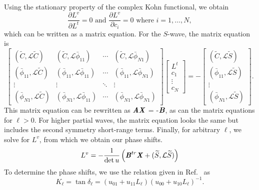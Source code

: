 \documentclass[preprint,showpacs,showkeys,preprintnumbers,amsmath,amssymb,longbibliography,pra,aps]{revtex4-1}
\begin{document}
Using the stationary property of the complex Kohn functional, we obtain
\begin{equation}
\frac{\partial L^v}{\partial L^t} = 0  \text{ and }
  \frac{\partial L^v}{\partial c_i} = 0 \text{ where $i = 1,\ldots,N$},
\label{eq:ComplexKohnStationary}
\end{equation}
which can be written as a matrix equation. For the $S$-wave, the matrix
equation is
\begin{equation}
\label{eq:ComplexKohnMatrix}
\begin{bmatrix} 
 (\widetilde{C},\mathcal{L}\widetilde{C}) & (\widetilde{C},\mathcal{L}\bar{\phi}_{11}) & \cdots & (\widetilde{C},\mathcal{L}\bar{\phi}_{N1})\\
 (\bar{\phi}_{11},\mathcal{L}\widetilde{C}) & (\bar{\phi}_{11},\mathcal{L}\bar{\phi}_{11}) & \cdots & (\bar{\phi}_{11},\mathcal{L}\bar{\phi}_{N1})\\
 \vdots & \vdots & \ddots & \vdots \\
 (\bar{\phi}_{N1},\mathcal{L}\widetilde{C}) & (\bar{\phi}_{N1},\mathcal{L}\bar{\phi}_{11}) & \cdots & (\bar{\phi}_{N1},\mathcal{L}\bar{\phi}_{N1})
\end{bmatrix}
\begin{bmatrix}
L^t\\
c_1\\
\vdots\\
c_N
\end{bmatrix}
= -
\begin{bmatrix}
(\widetilde{C},\mathcal{L}\widetilde{S}) \\
(\bar{\phi}_{11},\mathcal{L}\widetilde{S}) \\
\vdots \\
(\bar{\phi}_{N1},\mathcal{L}\widetilde{S})
\end{bmatrix}.
\end{equation}
This matrix equation can be rewritten as
$\textbf{\emph{AX}}$ = -$\textbf{\emph{B}}$, as can the matrix equations
for $\ell > 0$. For higher partial waves,
the matrix equation looks the same but includes the second symmetry
short-range terms. Finally, for arbitrary $\ell$, we solve for $L^v$, from which
we obtain our phase shifts.
\begin{equation}
L^v = -\frac{1}{\det u} \left( \textbf{\emph{B}}^{tr} \textbf{\emph{X}} +
  (\widetilde{S},\mathcal{L} \widetilde{S}) \right)
\end{equation}
To determine the phase shifts, we use the relation given in Ref.~\cite{Lucchese1989} as
\begin{equation}
\label{eq:GenKohnL}
K_\ell = \tan \delta_\ell = (u_{01} + u_{11} L_\ell)(u_{00} + u_{10}
  L_\ell)^{-1}.
\end{equation}
\end{document}
